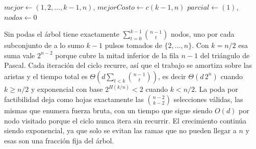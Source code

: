 \begin{algorithm}[htbp]
\caption{Backtracking con podas por factibilidad y por optimalidad}
\label{alg:bt}
$\mathit{mejor} \gets (1, 2, \ldots, k-1, n)$, $\mathit{mejorCosto} \gets c(k-1, n)$\;
$\mathit{parcial} \gets (1)$, $\mathit{nodos} \gets 0$\;
\;
\;
\BlankLine
{}
\end{algorithm}

Sin podas el árbol tiene exactamente $\sum_{t=0}^{k-1} \binom{n-1}{t}$ nodos, uno por cada subconjunto de a lo sumo $k-1$ pulsos tomados de $\{2, \ldots, n\}$. Con $k = n/2$ esa suma vale $2^{n-2}$ porque cubre la mitad inferior de la fila $n-1$ del triángulo de Pascal. Cada iteración del ciclo recurre, así que el trabajo se amortiza sobre las aristas y el tiempo total es $\Theta\!\left(d \sum_{t<k} \binom{n-1}{t}\right)$, es decir $\Theta(d\, 2^{n})$ cuando $k \ge n/2$ y exponencial con base $2^{H(k/n)} < 2$ cuando $k < n/2$. La poda por factibilidad deja como hojas exactamente las $\binom{n-2}{k-2}$ selecciones válidas, las mismas que enumera fuerza bruta, con un tiempo que sigue siendo $O(d)$ por nodo visitado porque el ciclo nunca itera sin recurrir. El crecimiento continúa siendo exponencial, ya que solo se evitan las ramas que no pueden llegar a $n$ y esas son una fracción fija del árbol.

